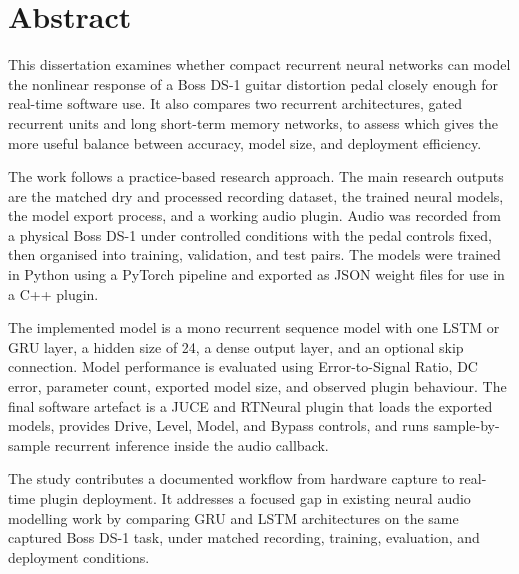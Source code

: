 \chapter*{Abstract}

This dissertation examines whether compact recurrent neural networks can model the nonlinear response of a Boss DS-1 guitar distortion pedal closely enough for real-time software use. It also compares two recurrent architectures, gated recurrent units and long short-term memory networks, to assess which gives the more useful balance between accuracy, model size, and deployment efficiency.

The work follows a practice-based research approach. The main research outputs are the matched dry and processed recording dataset, the trained neural models, the model export process, and a working audio plugin. Audio was recorded from a physical Boss DS-1 under controlled conditions with the pedal controls fixed, then organised into training, validation, and test pairs. The models were trained in Python using a PyTorch pipeline and exported as JSON weight files for use in a C++ plugin.

The implemented model is a mono recurrent sequence model with one LSTM or GRU layer, a hidden size of 24, a dense output layer, and an optional skip connection. Model performance is evaluated using Error-to-Signal Ratio, DC error, parameter count, exported model size, and observed plugin behaviour. The final software artefact is a JUCE and RTNeural plugin that loads the exported models, provides Drive, Level, Model, and Bypass controls, and runs sample-by-sample recurrent inference inside the audio callback.

The study contributes a documented workflow from hardware capture to real-time plugin deployment. It addresses a focused gap in existing neural audio modelling work by comparing GRU and LSTM architectures on the same captured Boss DS-1 task, under matched recording, training, evaluation, and deployment conditions.
